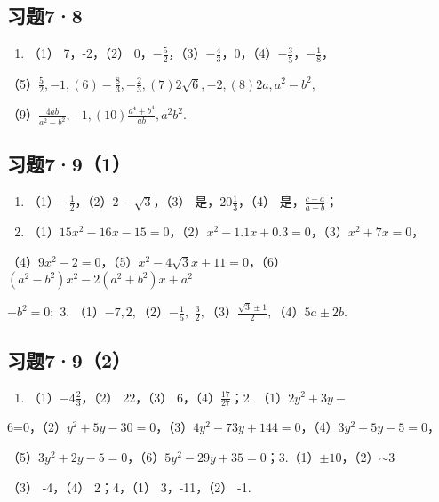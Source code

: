 \subsection{习题7·8}

\begin{enumerate}
\item
  （1） 7，-2，（2）
  0，\(-\frac{5}{2}\)，（3）\(-\frac{4}{3}\)，0，（4）\(-\frac{3}{5}\)，\(-\frac{1}{8}\)，
\end{enumerate}

（5）\(\frac{5}{2}, -1, (6) -\frac{8}{3}, -\frac{2}{3}, (7) 2\sqrt{6}, -2, (8) 2a, a^2 - b^2,\)

（9）\(\frac{4ab}{a^2 - b^2}, -1, (10)\frac{a^4 + b^4}{ab}, a^2b^2.\)

\subsection{习题7·9（1）}

\begin{enumerate}
\item
  （1）\(-\frac{1}{2}\)，（2）\(2 - \sqrt{3}\)，（3）
  是，\(20\frac{1}{3}\)，（4） 是，\(\frac{c - a}{a - b}\)；
\item
  （1）\(15x^{2} - 16x - 15 = 0\)，（2）\(x^{2} - 1.1x + 0.3 = 0\)，（3）\(x^{2} + 7x = 0\)，
\end{enumerate}

（4）\(9x^{2} - 2 = 0\)，（5）\(x^{2} - 4\sqrt{3} x + 11 = 0\)，（6）\((a^2 - b^2)x^2 - 2(a^2 + b^2)x + a^2\)

\(-b^{2}=0;\) 3.
（1）\(-7,2,\)（2）\(-\frac{1}{5},\) \(\frac{3}{2},\)（3）\(\frac{\sqrt{3}\pm1}{2},\)（4）\(5a\pm2b.\)

\subsection{习题7·9（2）}

\begin{enumerate}
\item
  （1）\(-4\frac{2}{3}\)，（2） 22，（3） 6，（4）\(\frac{17}{27}\)；2.
  （1）\(2y^{2} + 3y -\)
\end{enumerate}

6=0，（2）\(y^{2}+5y-30=0\)，（3）\(4y^{2}-73y+144=0\)，（4）\(3y^{2}+5y-5=0\)，

（5）\(3y^{2} + 2y - 5 = 0\)，（6）\(5y^{2} - 29y + 35 = 0\)；3.（1）\(\pm 10\)，（2）\(\sim 3\)

（3） -4，（4） 2；4，（1） 3，-11，（2） -1.

